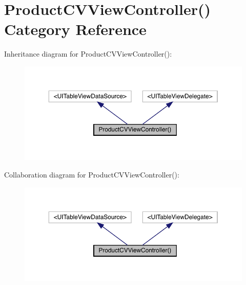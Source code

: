 \hypertarget{category_product_c_v_view_controller_07_08}{}\section{Product\+C\+V\+View\+Controller() Category Reference}
\label{category_product_c_v_view_controller_07_08}


Inheritance diagram for Product\+C\+V\+View\+Controller()\+:\nopagebreak
\begin{figure}[H]
\begin{center}
\leavevmode
\includegraphics[width=350pt]{category_product_c_v_view_controller_07_08__inherit__graph}
\end{center}
\end{figure}


Collaboration diagram for Product\+C\+V\+View\+Controller()\+:\nopagebreak
\begin{figure}[H]
\begin{center}
\leavevmode
\includegraphics[width=350pt]{category_product_c_v_view_controller_07_08__coll__graph}
\end{center}
\end{figure}
